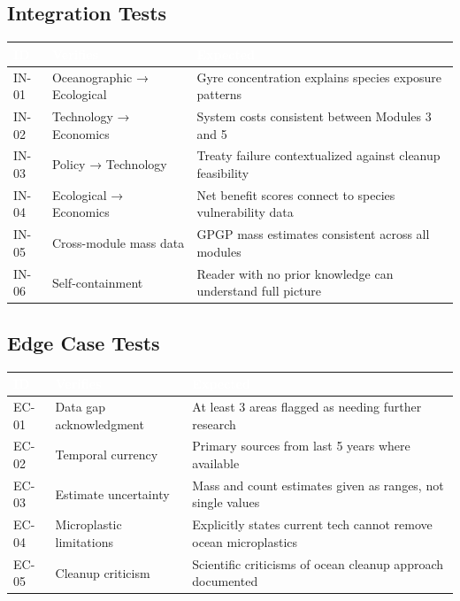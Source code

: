 \documentclass[11pt,letterpaper]{article}
\newcommand{\tableheader}[1]{\textbf{\sffamily\textcolor{white}{#1}}}
\begin{document}
\subsection{Integration Tests}

\begin{center}
\begin{tabularx}{\textwidth}{C{1.2cm}L{2.5cm}X}
\toprule
{}
\tableheader{ID} & \tableheader{Verifies} & \tableheader{Expected} \\
\midrule
IN-01 & Oceanographic → Ecological & Gyre concentration explains species exposure patterns \\
IN-02 & Technology → Economics & System costs consistent between Modules 3 and 5 \\
IN-03 & Policy → Technology & Treaty failure contextualized against cleanup feasibility \\
IN-04 & Ecological → Economics & Net benefit scores connect to species vulnerability data \\
IN-05 & Cross-module mass data & GPGP mass estimates consistent across all modules \\
IN-06 & Self-containment & Reader with no prior knowledge can understand full picture \\
\bottomrule
\end{tabularx}
\end{center}

\subsection{Edge Case Tests}

\begin{center}
\begin{tabularx}{\textwidth}{C{1.2cm}L{2.5cm}X}
\toprule
{}
\tableheader{ID} & \tableheader{Verifies} & \tableheader{Expected} \\
\midrule
EC-01 & Data gap acknowledgment & At least 3 areas flagged as needing further research \\
EC-02 & Temporal currency & Primary sources from last 5 years where available \\
EC-03 & Estimate uncertainty & Mass and count estimates given as ranges, not single values \\
EC-04 & Microplastic limitations & Explicitly states current tech cannot remove ocean microplastics \\
EC-05 & Cleanup criticism & Scientific criticisms of ocean cleanup approach documented \\
\bottomrule
\end{tabularx}
\end{center}
\end{document}
